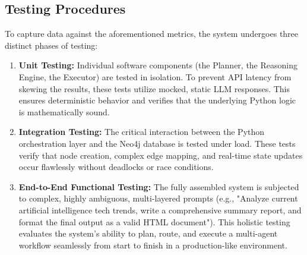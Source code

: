 \subsection{Testing Procedures}
To capture data against the aforementioned metrics, the system undergoes three distinct phases of testing:

\begin{enumerate}
    \item \textbf{Unit Testing:} Individual software components (the Planner, the Reasoning Engine, the Executor) are tested in isolation. To prevent API latency from skewing the results, these tests utilize mocked, static LLM responses. This ensures deterministic behavior and verifies that the underlying Python logic is mathematically sound.
    \item \textbf{Integration Testing:} The critical interaction between the Python orchestration layer and the Neo4j database is tested under load. These tests verify that node creation, complex edge mapping, and real-time state updates occur flawlessly without deadlocks or race conditions.
    \item \textbf{End-to-End Functional Testing:} The fully assembled system is subjected to complex, highly ambiguous, multi-layered prompts (e.g., "Analyze current artificial intelligence tech trends, write a comprehensive summary report, and format the final output as a valid HTML document"). This holistic testing evaluates the system's ability to plan, route, and execute a multi-agent workflow seamlessly from start to finish in a production-like environment.
\end{enumerate}
